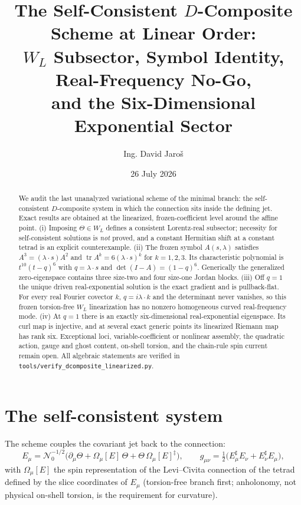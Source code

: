 \documentclass[11pt,a4paper]{article}
\title{The Self-Consistent $D$-Composite Scheme at Linear Order:\\
$W_L$ Subsector, Symbol Identity, Real-Frequency No-Go,\\
and the Six-Dimensional Exponential Sector}
\author{Ing. David Jaro\v{s}}
\date{26 July 2026}
\newcommand{\dd}{\ddagger}
\begin{document}
\maketitle

\begin{abstract}
We audit the last unanalyzed variational scheme of the minimal branch:
the self-consistent $D$-composite system in which the connection sits
inside the defining jet.  Exact results are obtained at the linearized,
frozen-coefficient level around the affine point.  (i) Imposing
$\Theta\in W_L$ defines a consistent Lorentz-real subsector; necessity
for self-consistent solutions is \emph{not} proved, and a constant
Hermitian shift at a constant tetrad is an explicit counterexample.
(ii) The frozen symbol $A(s,\lambda)$ satisfies
$A^3=(\lambda\!\cdot\!s)A^2$ and
$\operatorname{tr}A^k=6(\lambda\!\cdot\!s)^k$ for $k=1,2,3$.
Its characteristic polynomial is $t^{10}(t-q)^6$ with
$q=\lambda\!\cdot\!s$ and $\det(I-A)=(1-q)^6$.  Generically the
generalized zero-eigenspace contains three size-two and four size-one
Jordan blocks.  (iii) Off $q=1$ the unique driven real-exponential
solution is the exact gradient and is pullback-flat.  For every real
Fourier covector $k$, $q=i\lambda\!\cdot\!k$ and the determinant never
vanishes, so this frozen torsion-free $W_L$ linearization has no nonzero
homogeneous curved real-frequency mode.  (iv) At $q=1$ there is an
exactly six-dimensional real-exponential eigenspace.  Its curl map is
injective, and at several exact generic points its linearized Riemann
map has rank six.  Exceptional loci, variable-coefficient or nonlinear
assembly, the quadratic action, gauge and ghost content, on-shell
torsion, and the chain-rule spin current remain open.  All algebraic
statements are verified in
\texttt{tools/verify\_dcomposite\_linearized.py}.
\end{abstract}

\section{The self-consistent system}
The scheme couples the covariant jet back to the connection:
\begin{equation}
  E_\mu=\mathcal N_0^{-1/2}\bigl(\partial_\mu\Theta
  +\Omega_\mu[E] \,\Theta+\Theta\,\Omega_\mu[E]^{\dd}\bigr),
  \qquad
  g_{\mu\nu}=\tfrac12\bigl(E_\mu^\sharp E_\nu+E_\nu^\sharp E_\mu\bigr),
  \label{eq:selfcons}
\end{equation}
with $\Omega_\mu[E]$ the spin representation of the Levi--Civita
connection of the tetrad defined by the slice coordinates of $E_\mu$
(torsion-free branch first; anholonomy, not physical on-shell torsion,
is the requirement for curvature).
\end{document}
